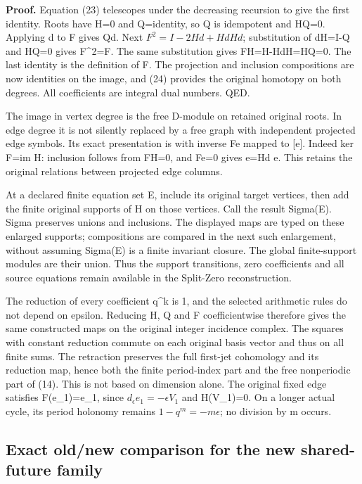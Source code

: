 \textbf{Proof.} Equation (23) telescopes under the decreasing recursion
to give the first identity. Roots have H=0 and Q=identity, so Q is
idempotent and HQ=0. Applying d to F gives Qd. Next \(F^2=I-2Hd+HdHd\);
substitution of dH=I-Q and HQ=0 gives F\^{}2=F. The same substitution
gives FH=H-HdH=HQ=0. The last identity is the definition of F. The
projection and inclusion compositions are now identities on the image,
and (24) provides the original homotopy on both degrees. All
coefficients are integral dual numbers. QED.

The image in vertex degree is the free D-module on retained original
roots. In edge degree it is not silently replaced by a free graph with
independent projected edge symbols. Its exact presentation is
 with inverse Fe mapped to {[}e{]}. Indeed ker
F=im H: inclusion follows from FH=0, and Fe=0 gives e=Hd e. This retains
the original relations between projected edge columns.

At a declared finite equation set E, include its original target
vertices, then add the finite original supports of H on those vertices.
Call the result Sigma(E). Sigma preserves unions and inclusions. The
displayed maps are typed on these enlarged supports; compositions are
compared in the next such enlargement, without assuming Sigma(E) is a
finite invariant closure. The global finite-support modules are their
union. Thus the support transitions, zero coefficients and all source
equations remain available in the Split-Zero reconstruction.

The reduction of every coefficient q\^{}k is 1, and the selected
arithmetic rules do not depend on epsilon. Reducing H, Q and F
coefficientwise therefore gives the same constructed maps on the
original integer incidence complex. The squares with constant reduction
commute on each original basis vector and thus on all finite sums. The
retraction preserves the full first-jet cohomology and its reduction
map, hence both the finite period-index part and the free nonperiodic
part of (14). This is not based on dimension alone. The original fixed
edge satisfies F(e\_1)=e\_1, since \(d_\epsilon e_1=-\epsilon V_1\) and
H(V\_1)=0. On a longer actual cycle, its period holonomy remains
\(1-q^m=-m\epsilon\); no division by m occurs.

\subsection{Exact old/new comparison for the new shared-future family}

